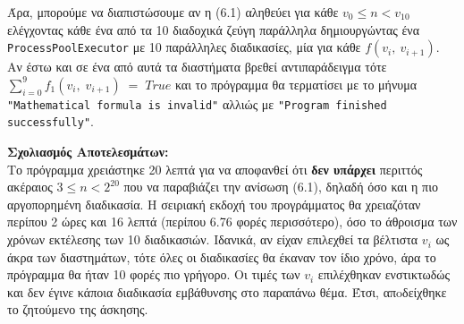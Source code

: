 \documentclass[12pt]{article}
\newcommand{\lt}{\latintext}
\begin{document}
\noindent
Άρα, μπορούμε να διαπιστώσουμε αν η (6.1) αληθεύει για κάθε 
$v_0 \leq n < v_{10}$ ελέγχοντας κάθε ένα από τα 10 διαδοχικά 
ζεύγη παράλληλα δημιουργώντας ένα 
\texttt{\lt ProcessPoolExecutor} με 10 παράλληλες διαδικασίες, μία για κάθε $f(v_i,\:v_{i+1})$. Αν έστω και σε ένα από αυτά τα διαστήματα βρεθεί αντιπαράδειγμα τότε 
$\sum_{i=0}^{9}f_{1}(v_{i},\;v_{i+1})\; =\; True$
και το πρόγραμμα θα τερματίσει με το μήνυμα 
\texttt{\lt "Mathematical formula is invalid"}
αλλιώς με \texttt{\lt "Program finished successfully"}.

\pagebreak

\noindent
\textbf{Σχολιασμός Αποτελεσμάτων:}\\

\noindent
Το πρόγραμμα χρειάστηκε 20 λεπτά για να αποφανθεί ότι 
\textbf{δεν υπάρχει} περιττός ακέραιος $3 \leq n < 2^{20}$ 
που να παραβιάζει την ανίσωση (6.1), δηλαδή όσο και η 
πιο αργοπορημένη διαδικασία. Η σειριακή εκδοχή του 
προγράμματος θα χρειαζόταν περίπου 2 ώρες και 16 λεπτά 
(περίπου 6.76 φορές περισσότερο), όσο το άθροισμα 
των χρόνων εκτέλεσης των 10 διαδικασιών. Ιδανικά, αν είχαν 
επιλεχθεί τα βέλτιστα $v_i$ ως άκρα των διαστημάτων, τότε όλες 
οι διαδικασίες θα έκαναν τον ίδιο χρόνο, άρα το πρόγραμμα θα 
ήταν 10 φορές πιο γρήγορο. Οι τιμές των $v_i$ επιλέχθηκαν 
ενστικτωδώς και δεν έγινε κάποια διαδικασία εμβάθυνσης στο 
παραπάνω θέμα. Έτσι, απoδείχθηκε το ζητούμενο της άσκησης.\\
\end{document}
